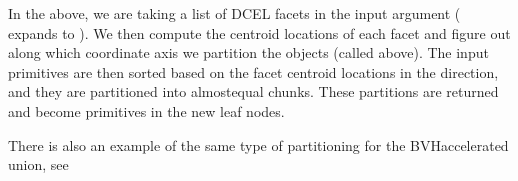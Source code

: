\documentclass[letterpaper,10pt,english]{sphinxmanual}
\begin{document}
\begin{itemize}
\begin{sphinxVerbatim}[commandchars=\\\{\}]
     
    \PYG{p}{[}\PYG{p}{]}          
       

    
\end{sphinxVerbatim}

\sphinxAtStartPar
In the above, we are taking a list of DCEL facets in the input argument ( expands to ).
We then compute the centroid locations of each facet and figure out along which coordinate axis we partition the objects (called  above).
The input primitives are then sorted based on the facet centroid locations in the  direction, and they are partitioned into  almost\sphinxhyphen{}equal chunks.
These partitions are returned and become primitives in the new leaf nodes.

\sphinxAtStartPar
There is also an example of the same type of partitioning for the BVH\sphinxhyphen{}accelerated union, see 

\end{itemize}
\end{document}
